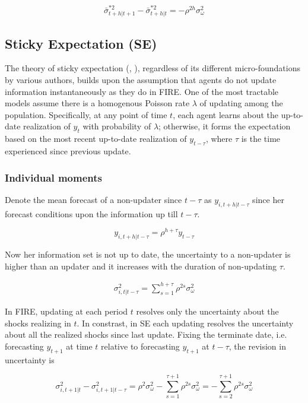 \documentclass[]{article}
\begin{document}
	$$\bar \sigma^{*2}_{t+h|t+1} - \bar \sigma^{*2}_{t+h|t} = - \rho^{2h}\sigma^2_\omega$$
	
	
	\subsection{Sticky Expectation (SE)}
	
	The theory of sticky expectation (\citet{xx}, \citet{xx} ), regardless of its different micro-foundations by various authors, builds upon the assumption that agents do not update information instantaneously as they do in FIRE. One of the most tractable models assume there is a homogenous Poisson rate $\lambda$ of updating among the population. Specifically, at any point of time $t$, each agent learns about the up-to-date realization of $y_t$ with probability of $\lambda$; otherwise, it forms the expectation based on the most recent up-to-date realization of $y_{t-\tau}$, where $\tau$ is the time experienced since previous update. 
	
	
	
	
	\subsubsection{Individual moments} 
	
	Denote the mean forecast of a non-updater since $t-\tau$ as $y_{i,t+h|t-\tau}$ since her forecast conditions upon the information up till $t-\tau$.
	
	$$y_{i,t+h|t-\tau} = \rho^{h+\tau} y_{t-\tau}$$
	
	Now her information set is not up to date, the uncertainty to a non-updater is higher than an updater and it increases with the duration of non-updating $\tau$. 
	
	\begin{eqnarray}\label{VarSEInd}
		\sigma^2_{i,t|t-\tau}= \sum^{h+\tau}_{s=1}\rho^{2s} \sigma^2_{\omega}
	\end{eqnarray}	
	
	In FIRE, updating at each period $t$ resolves only the uncertainty about the shocks realizing in $t$. In constrast, in SE each updating resolves the uncertainty about all the realized shocks since last update. Fixing the terminate date, i.e. forecasting  $y_{t+1}$ at time $t$ relative to forecasting $y_{t+1}$ at $t-\tau$, the revision in uncertainty is 
	
	$$\sigma^2_{i,t+1|t} - \sigma^2_{i,t+1|t-\tau} = \rho^{2} \sigma^2_{\omega} - \sum^{\tau+1}_{s=1}\rho^{2s} \sigma^2_{\omega} = -\sum^{\tau+1}_{s=2} \rho^{2s}\sigma^2_{\omega}$$
	
\end{document}
